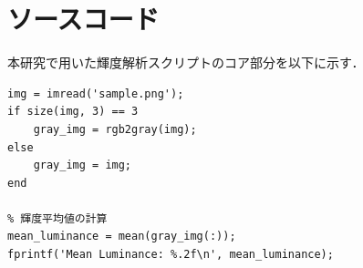 \documentclass[book,paper=a4,fontsize=16pt,openany]{jlreq}
\begin{document}
\chapter{ソースコード}

本研究で用いた輝度解析スクリプトのコア部分を以下に示す．

\begin{lstlisting}[caption=輝度チェックおよび特徴量抽出コード, label=code:matlab_sample]
% 画像の読み込みとグレースケール変換
img = imread('sample.png');
if size(img, 3) == 3
    gray_img = rgb2gray(img);
else
    gray_img = img;
end

% 輝度平均値の計算
mean_luminance = mean(gray_img(:));
fprintf('Mean Luminance: %.2f\n', mean_luminance);
\end{lstlisting}
\end{document}
